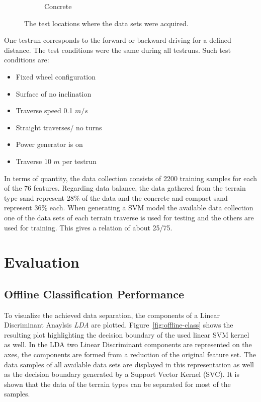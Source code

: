 \documentclass{article}
\begin{document}
\begin{figure}[!htb]
\begin{subfigure}[t]{0.32\textwidth}
        \caption{Concrete}
    \end{subfigure}
 \caption{The test locations where the data sets were acquired.}
 \label{fig:TestLocs}
\end{figure}


 
One testrun corresponds to the forward or backward driving for a defined distance. The test conditions were the same during all testruns. Such test conditions are:
\begin{itemize}
\item Fixed wheel configuration
\item Surface of no inclination
\item Traverse speed 0.1 $m/s$
\item Straight traverses/ no turns
\item Power generator is on
\item Traverse 10 $m$ per testrun
\end{itemize}

In terms of quantity, the data collection consists of 2200 training samples for each of the 76 features. Regarding data balance, the data gathered from the terrain type sand represent 28\% of the data and the concrete and compact sand represent 36\% each. 
When generating a SVM model the available data collection one of the data sets of each terrain traverse is used for testing and the others are used for training. This gives a relation of about 25/75.

\section{Evaluation}
\subsection{Offline Classification Performance}

To visualize the achieved data separation, the components of a Linear Discriminant Anaylsis \emph{LDA} are plotted. 
Figure~\ref{fig:offline-class} shows the resulting plot highlighting the decision boundary of the used linear SVM kernel as well. In the LDA two Linear Discriminant components are represented on the axes, the components are formed from a reduction of the original feature set. The data samples of all available data sets are displayed in this representation as well as the decision boundary generated by a Support Vector Kernel (SVC). It is shown that the data of the terrain types can be separated for most of the samples.
\end{document}
